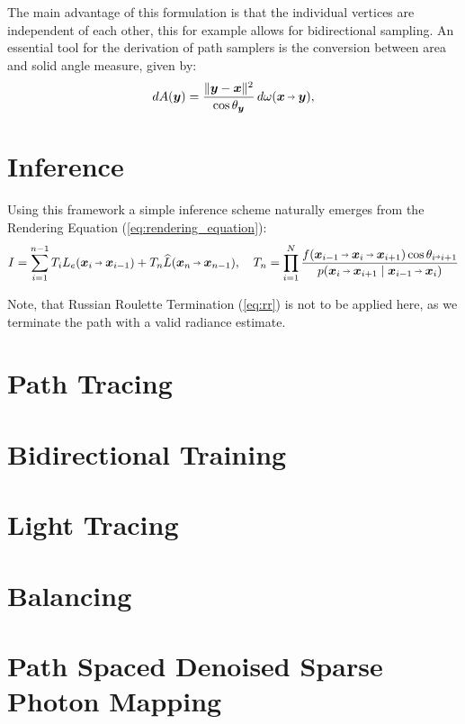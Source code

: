 The main advantage of this formulation is that the individual vertices are independent of each other, this for example allows for bidirectional sampling.
An essential tool for the derivation of path samplers is the conversion between area and solid angle measure, given by:
\begin{equation}
\label{eq:area_solid_angle}
\diff A(\vec{y}) = \frac{\|\vec{y} - \vec{x}\|^2}{\cos \theta_{\vec{y}}} \diff \omega(\vec{x}\pto\vec{y}),
\end{equation}

\section{Inference}
Using this framework a simple inference scheme naturally emerges from the Rendering Equation (\autoref{eq:rendering_equation}):
\begin{equation}
\label{eq:inference}
    I
    = \sum_{i=1}^{n-1} T_i L_e(\pdir{i}{i-1}) + T_n \widehat{L}(\pdir{n}{n-1}), \quad
    T_n
    = \prod_{i=1}^{N} \frac{f(\ptrip{i-1}{i}{i+1}) \cos \theta_{i \veryshortarrow i+1}}{p(\pdir{i}{i+1} \mid \pdir{i-1}{i})}
\end{equation}

Note, that Russian Roulette Termination (\autoref{eq:rr}) is not to be applied here, as we terminate the path with a valid radiance estimate.

\section{Path Tracing}

\section{Bidirectional Training}

\section{Light Tracing}

\section{Balancing}

\section{Path Spaced Denoised Sparse Photon Mapping}

